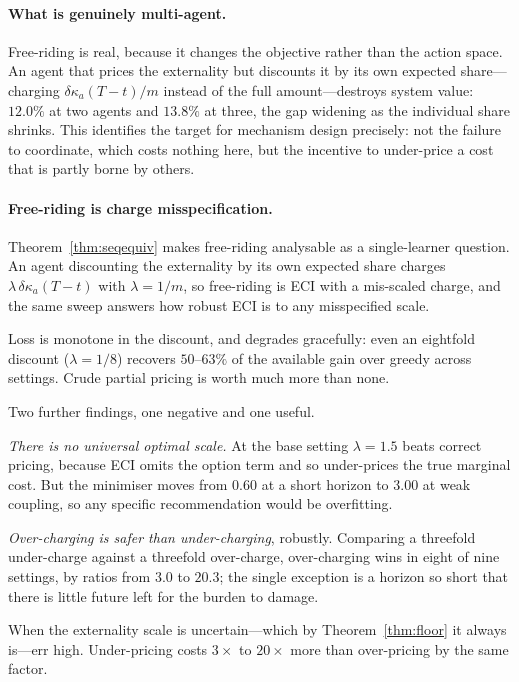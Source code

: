 \paragraph{What is genuinely multi-agent.} Free-riding is real, because it changes
the objective rather than the action space. An agent that prices the externality but
discounts it by its own expected share---charging $\delta\kappa_a(T-t)/m$ instead of
the full amount---destroys system value: $12.0\%$ at two agents and $13.8\%$ at
three, the gap widening as the individual share shrinks. This identifies the target
for mechanism design precisely: not the failure to coordinate, which costs nothing
here, but the incentive to under-price a cost that is partly borne by others.

\paragraph{Free-riding is charge misspecification.} Theorem~\ref{thm:seqequiv}
makes free-riding analysable as a single-learner question. An agent discounting the
externality by its own expected share charges $\lambda\,\delta\kappa_a(T-t)$ with
$\lambda = 1/m$, so free-riding is ECI with a mis-scaled charge, and the same sweep
answers how robust ECI is to any misspecified scale.

Loss is monotone in the discount, and degrades gracefully: even an eightfold
discount ($\lambda = 1/8$) recovers $50$--$63\%$ of the available gain over greedy
across settings. Crude partial pricing is worth much more than none.

Two further findings, one negative and one useful.

\emph{There is no universal optimal scale.} At the base setting $\lambda = 1.5$
beats correct pricing, because ECI omits the option term and so under-prices the
true marginal cost. But the minimiser moves from $0.60$ at a short horizon to
$3.00$ at weak coupling, so any specific recommendation would be overfitting.

\emph{Over-charging is safer than under-charging}, robustly. Comparing a threefold
under-charge against a threefold over-charge, over-charging wins in eight of nine
settings, by ratios from $3.0$ to $20.3$; the single exception is a horizon so
short that there is little future left for the burden to damage.

\begin{corollary}
When the externality scale is uncertain---which by Theorem~\ref{thm:floor} it always
is---err high. Under-pricing costs $3\times$ to $20\times$ more than over-pricing by
the same factor.
\end{corollary}

